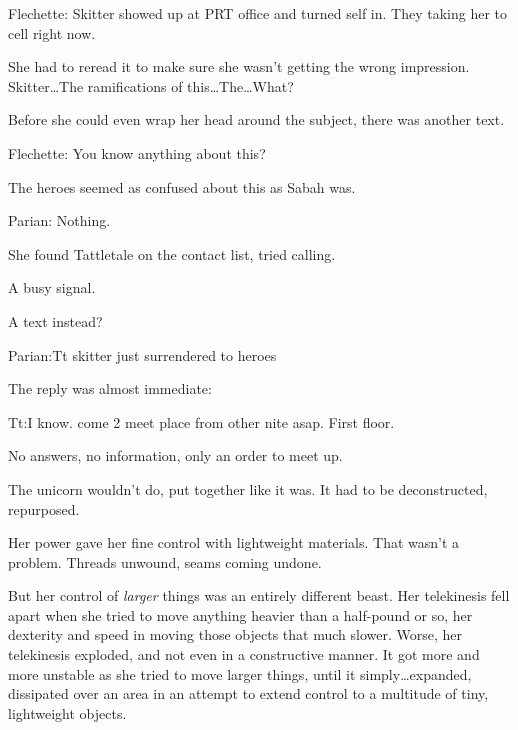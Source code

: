 Flechette:
Skitter showed up at PRT office and turned self in.  They taking her to cell right now.



She had to reread it to make sure she wasn't getting the wrong impression.  Skitter\ldots The ramifications of this\ldots The\ldots What?



Before she could even wrap her head around the subject, there was another text.



Flechette:
You know anything about this?



The heroes seemed as confused about this as Sabah was.



Parian:
Nothing.



She found Tattletale on the contact list, tried calling.



A busy signal.



A text instead?



Parian:Tt skitter just surrendered to heroes



The reply was almost immediate:



Tt:I know. come 2 meet place from other nite asap.  First floor.



No answers, no information, only an order to meet up.



The unicorn wouldn't do, put together like it was.  It had to be deconstructed, repurposed.



Her power gave her fine control with lightweight materials.  That wasn't a problem.  Threads unwound, seams coming undone.



But her control of \emph{larger} things was an entirely different beast.  Her telekinesis fell apart when she tried to move anything heavier than a half-pound or so, her dexterity and speed in moving those objects that much slower.  Worse, her telekinesis exploded, and not even in a constructive manner.  It got more and more unstable as she tried to move larger things, until it simply\ldots expanded, dissipated over an area in an attempt to extend control to a multitude of tiny, lightweight objects.



